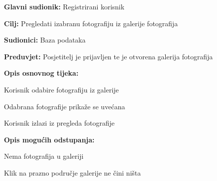 					\noindent {}
					\begin{packed_item}
						
						\item \textbf{Glavni sudionik: } Registrirani korisnik
						\item  \textbf{Cilj:} Pregledati izabranu fotografiju iz galerije fotografija
						\item  \textbf{Sudionici:} Baza podataka
						\item  \textbf{Preduvjet:} Posjetitelj je prijavljen te je otvorena galerija fotografija
						\item  \textbf{Opis osnovnog tijeka:}
						
						\item[] \begin{packed_enum}
							
							\item Korisnik odabire fotografiju iz galerije
							\item Odabrana fotografije prikaže se uvećana
							\item Korisnik izlazi iz pregleda fotografije
							
						\end{packed_enum}
						
						\item  \textbf{Opis mogućih odstupanja:}
						
						\item[] \begin{packed_item}
							
							\item[1.a] Nema fotografija u galeriji
							\item[] \begin{packed_enum}
								
								\item Klik na prazno područje galerije ne čini ništa
								
							\end{packed_enum}
							
						\end{packed_item}
					\end{packed_item}
					
